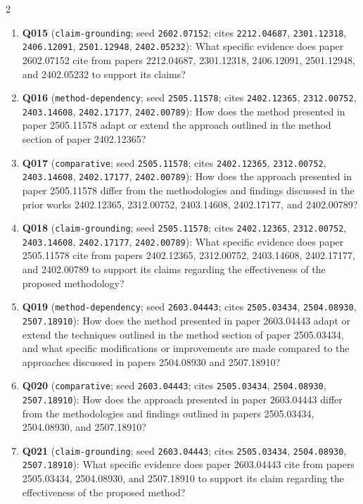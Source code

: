 \documentclass[10pt]{article}
\begin{document}
{\begin{multicols}{2}
\begin{enumerate}[leftmargin=1.0em,itemsep=0.05em,topsep=0pt,parsep=0pt]
  \item \textbf{Q015} (\texttt{claim-grounding}; seed \texttt{2602.07152}; cites \texttt{2212.04687}, \texttt{2301.12318}, \texttt{2406.12091}, \texttt{2501.12948}, \texttt{2402.05232}): What specific evidence does paper 2602.07152 cite from papers 2212.04687, 2301.12318, 2406.12091, 2501.12948, and 2402.05232 to support its claims?
  \item \textbf{Q016} (\texttt{method-dependency}; seed \texttt{2505.11578}; cites \texttt{2402.12365}, \texttt{2312.00752}, \texttt{2403.14608}, \texttt{2402.17177}, \texttt{2402.00789}): How does the method presented in paper 2505.11578 adapt or extend the approach outlined in the method section of paper 2402.12365?
  \item \textbf{Q017} (\texttt{comparative}; seed \texttt{2505.11578}; cites \texttt{2402.12365}, \texttt{2312.00752}, \texttt{2403.14608}, \texttt{2402.17177}, \texttt{2402.00789}): How does the approach presented in paper 2505.11578 differ from the methodologies and findings discussed in the prior works 2402.12365, 2312.00752, 2403.14608, 2402.17177, and 2402.00789?
  \item \textbf{Q018} (\texttt{claim-grounding}; seed \texttt{2505.11578}; cites \texttt{2402.12365}, \texttt{2312.00752}, \texttt{2403.14608}, \texttt{2402.17177}, \texttt{2402.00789}): What specific evidence does paper 2505.11578 cite from papers 2402.12365, 2312.00752, 2403.14608, 2402.17177, and 2402.00789 to support its claims regarding the effectiveness of the proposed methodology?
  \item \textbf{Q019} (\texttt{method-dependency}; seed \texttt{2603.04443}; cites \texttt{2505.03434}, \texttt{2504.08930}, \texttt{2507.18910}): How does the method presented in paper 2603.04443 adapt or extend the techniques outlined in the method section of paper 2505.03434, and what specific modifications or improvements are made compared to the approaches discussed in papers 2504.08930 and 2507.18910?
  \item \textbf{Q020} (\texttt{comparative}; seed \texttt{2603.04443}; cites \texttt{2505.03434}, \texttt{2504.08930}, \texttt{2507.18910}): How does the approach presented in paper 2603.04443 differ from the methodologies and findings outlined in papers 2505.03434, 2504.08930, and 2507.18910?
  \item \textbf{Q021} (\texttt{claim-grounding}; seed \texttt{2603.04443}; cites \texttt{2505.03434}, \texttt{2504.08930}, \texttt{2507.18910}): What specific evidence does paper 2603.04443 cite from papers 2505.03434, 2504.08930, and 2507.18910 to support its claim regarding the effectiveness of the proposed method?

\end{enumerate}
\end{multicols}}
\end{document}
